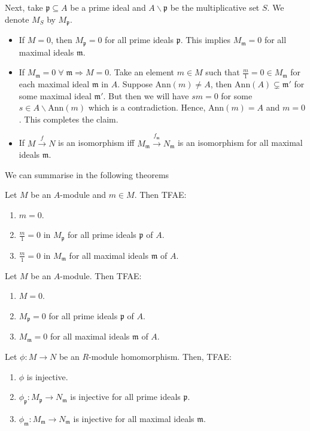 \documentclass[oneside, 12pt, ]{scrbook}
\newcommand{\pr}{\mathfrak{p}}
\newcommand{\m}{\mathfrak{m}}
\newcommand{\bs}{\backslash}
\theoremstyle{theorem}
\begin{document}
Next, take $\pr \subseteq A$ be a prime ideal and $A\backslash \pr$ be the multiplicative set $S$. We denote $M_{S}$ by $M_{\pr}$.
\begin{itemize}
\item If $M=0$, then $M_{\pr} =0$ for all prime ideals $\pr$. This implies $M_{\m} =0$ for all maximal ideals $\m$.
\item If $M_{\m} =0 \; \forall \; \m \Rightarrow M=0$. Take an element $m \in M$ such that $\frac{m}{1}=0 \in M_{\m}$ for each maximal ideal $\m $ in $A$. Suppose $\mathrm{Ann}(m) \neq A$, then $\mathrm{Ann}(A) \subsetneq \m'$ for some maximal ideal $\m'$. But then we will have $sm=0$ for some $s\in A \bs \mathrm{Ann}(m)$ which is a contradiction. Hence, $\mathrm{Ann}(m)=A$ and $m=0$. This completes the claim.
\item If $M \xrightarrow{f} N$ is an isomorphism iff $M_{\m} \xrightarrow{f_{\m}} N_{\m}$ is an isomorphism for all maximal ideals $\m$.
\end{itemize}
We can summarise in the following theorems
\begin{theorem}
Let $M$ be an $A$-module and $m \in M$. Then TFAE:
\begin{enumerate}
\item $m=0$.
\item $\frac{m}{1}=0$ in $M_{\pr}$ for all prime ideals $\pr$ of $A$.
\item $\frac{m}{1}=0$ in $M_{\m}$ for all maximal ideals $\m$ of $A$. 
\end{enumerate}
\end{theorem}

\begin{theorem}
Let $M$ be an $A$-module. Then TFAE:
\begin{enumerate}
\item $M=0$.
\item $M_{\pr}=0$ for all prime ideals $\pr$ of $A$.
\item $M_{\m}=0$ for all maximal ideals $\m$ of $A$. 
\end{enumerate}
\end{theorem}

\begin{theorem}
Let $\phi: M \rightarrow N$ be an $R$-module homomorphism. Then, TFAE:
\begin{enumerate}
\item $\phi$ is injective. 
\item $\phi_{\pr}: M_{\pr} \rightarrow N_{\m}$ is injective for all prime ideals $\pr$.
\item $\phi_{\m} : M_{\m} \rightarrow N_{\m}$ is injective for all maximal ideals $\m$.
\end{enumerate} 
\end{theorem}
\end{document}
